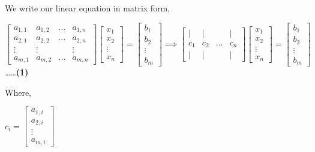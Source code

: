 \documentclass[a4paper]{article}
\begin{document}
We write our linear equation in matrix form,
\begin{center}
    $ 
    \begin{bmatrix}
    a_{1,1} & a_{1,2} & \dots & a_{1,n} \\ 
    a_{2,1} & a_{2,2} & \dots & a_{2,n} \\
    \vdots  & \vdots  &       & \vdots  \\
    a_{m,1} & a_{m,2} & \dots & a_{m,n} 
    \end{bmatrix}
    \begin{bmatrix}
    x_1   \\ 
    x_2   \\
    \vdots\\
    x_n 
    \end{bmatrix} = 
    \begin{bmatrix}
    b_1   \\ 
    b_2   \\
    \vdots\\
    b_m 
    \end{bmatrix}
    
    \implies \begin{bmatrix}
    |   & |       &       & |     \\ 
    c_1 & c_2     & \dots & c_n   \\
    |   & |       &       & |        
    \end{bmatrix}
    \begin{bmatrix}
    x_1   \\ 
    x_2   \\
    \vdots\\
    x_n 
    \end{bmatrix} = 
    \begin{bmatrix}
    b_1   \\ 
    b_2   \\
    \vdots\\
    b_m
    \end{bmatrix}
    $  \dots\dots \textbf{(1)}
\end{center}

Where,
\begin{center}
    $
    c_i = 
    \begin{bmatrix}
    a_{1,i}   \\ 
    a_{2,i}   \\
    \vdots    \\
    a_{m,i} 
    \end{bmatrix}
    $
\end{center}
\end{document}
